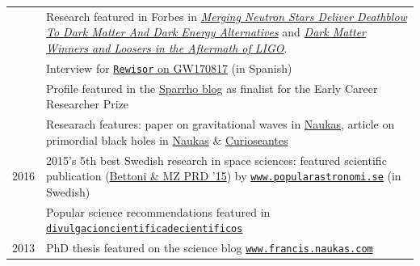 \documentclass[11pt,a4paper]{article}
\begin{document}
\begin{longtable}{c p{15cm}}
\\[2pt]
& Research featured in {Forbes} in \href{https://www.forbes.com/sites/startswithabang/2017/10/25/merging-neutron-stars-deliver-deathblow-to-dark-matter-and-dark-energy-alternatives}{\textit{Merging Neutron Stars Deliver Deathblow To Dark Matter And Dark Energy Alternatives}} and
\href{https://www.forbes.com/sites/startswithabang/2017/12/12/dark-matter-winners-and-losers-in-the-aftermath-of-ligo}{\textit{Dark Matter Winners and Loosers in the Aftermath of LIGO}}.
\\[2pt] 
& {Interview} for \href{http://www.rewisor.com/ondas-gravitacionales-estrellas-neutrones}{\texttt{Rewisor} on GW170817} (in Spanish)  \\[2pt]
 &  Profile featured in the \href{https://medium.com/sparrho/young-researchers-present-on-the-global-stage-part-7-8a31da24c8ab}{Sparrho blog} as finalist for the Early Career Researcher Prize
\\[2pt] 
& Researach features: paper on gravitational waves in \href{http://francis.naukas.com/2017/12/20/la-velocidad-de-las-ondas-gravitacionales/#comment-445151}{Naukas}, article on primordial black holes in \href{http://francis.naukas.com/2017/12/07/42781/}{Naukas} \& \href{http://curioseantes.blogspot.com.es/2017/12/hay-suficientes-macho-o-no.html?m=1}{Curioseantes} \\[2pt]
2016 
& {2015's 5th best Swedish research} in space sciences: featured scientific publication (\href{http://arxiv.org/abs/1502.02666}{Bettoni \& MZ PRD '15}) by \href{http://www.popularastronomi.se/2016/01/arets-basta-svenska-astroforskning-2015-mork-materia-utmanare-till-einstein-och-rosettas-komet/}{\tt www.popularastronomi.se} (in Swedish)
\\[2pt]
 & Popular science recommendations featured in \href{http://divulgacioncientificadecientificos.blogspot.com.es/2016/03/miguel-zumalacarregui-perez-nordita.html}{\tt divulgacioncientificadecientificos}
\\[2pt]
2013 & PhD thesis featured on the science blog \href{http://francis.naukas.com/2013/01/01/el-metodo-cientifico-la-energia-oscura-y-la-importancia-de-la-quintaesencia/}{\tt www.francis.naukas.com} \\[2pt]
\end{longtable}
\vspace{-0.3cm}


\end{document}

